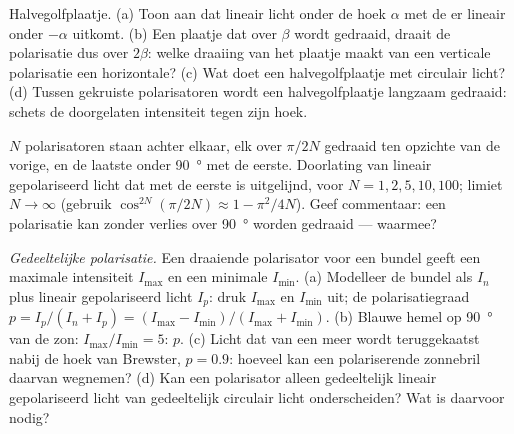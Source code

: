 \begin{exercise}[$\star\star$]\label{exo:b2:plane-waves-polarization:7}
Halvegolfplaatje. (a) Toon aan dat lineair licht onder de hoek $\alpha$ met
de  er lineair onder $-\alpha$ uitkomt. (b) Een plaatje dat over
$\beta$ wordt gedraaid, draait de polarisatie dus over $2\beta$: welke
draaiing van het plaatje maakt van een verticale polarisatie een
horizontale? (c) Wat doet een halvegolfplaatje met circulair licht? (d)
Tussen gekruiste polarisatoren wordt een halvegolfplaatje langzaam gedraaid:
schets de doorgelaten intensiteit tegen zijn hoek.
\end{exercise}

\begin{exercise}[$\star\star$]\label{exo:b2:plane-waves-polarization:8}
$N$ polarisatoren staan achter elkaar, elk over $\pi/2N$ gedraaid ten
opzichte van de vorige, en de laatste onder \qty{90}{\degree} met de eerste.
Doorlating van lineair gepolariseerd licht dat met de eerste is uitgelijnd,
voor $N = 1, 2, 5, 10, 100$; limiet $N \to \infty$ (gebruik
$\cos^{2N}(\pi/2N) \approx
1 - \pi^2/4N$). Geef commentaar: een polarisatie
kan zonder verlies over \qty{90}{\degree} worden gedraaid --- waarmee?
\end{exercise}

\begin{exercise}[$\star\star$]\label{exo:b2:plane-waves-polarization:9}
\emph{Gedeeltelijke polarisatie.} Een draaiende polarisator voor een bundel
geeft een maximale intensiteit $I_{\max}$ en een minimale $I_{\min}$. (a)
Modelleer de bundel als  $I_n$ plus lineair gepolariseerd
licht $I_p$: druk $I_{\max}$ en $I_{\min}$ uit; de polarisatiegraad
$p = I_p/(I_n + I_p) =
(I_{\max} - I_{\min})/(I_{\max} + I_{\min})$. (b)
Blauwe hemel op \qty{90}{\degree} van de zon: $I_{\max}/I_{\min} = 5$: $p$.
(c) Licht dat van een meer wordt teruggekaatst nabij de hoek van Brewster,
$p = 0.9$: hoeveel kan een polariserende zonnebril daarvan wegnemen? (d) Kan
een polarisator alleen gedeeltelijk lineair gepolariseerd licht van
gedeeltelijk circulair licht onderscheiden? Wat is daarvoor nodig?
\end{exercise}

